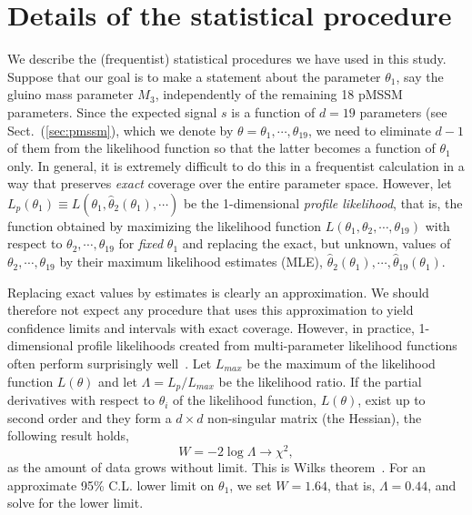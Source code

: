 \section{Details of the statistical procedure}
\label{sec:stat}
We describe the (frequentist) 
statistical procedures we have used in this study.  Suppose 
that our goal is to make a statement about the parameter $\theta_1$,
say the gluino mass
parameter $M_3$, independently of the remaining 18 pMSSM parameters. Since the 
expected signal $s$ is a function of  $d = 19$ parameters (see Sect.~(\ref{sec:pmssm}),
which we denote by $\theta = \theta_1,\cdots,\theta_{19}$,  we need to eliminate $d - 1$ of them from the likelihood function so that the latter becomes a function of $\theta_1$ only. In general, it is extremely difficult to do this in 
a frequentist calculation in a way that preserves \emph{exact} coverage over the entire parameter
space. However, let $L_p(\theta_1) \equiv L(\theta_1, \hat{\theta}_2(\theta_1), \cdots)$ be the 
1-dimensional \emph{profile likelihood}, that is, the function obtained by maximizing the likelihood function $L(\theta_1, \theta_2, \cdots, \theta_{19})$ with respect to $\theta_2,\cdots,\theta_{19}$ for \emph{fixed} $\theta_1$ and replacing the exact, but unknown, values of $\theta_2,\cdots,\theta_{19}$
by their maximum likelihood estimates (MLE),  $\hat{\theta}_2(\theta_1),\cdots,\hat{\theta}_{19}(\theta_1)$. 

Replacing exact values by estimates is clearly an approximation. We should therefore not
expect any procedure that uses this approximation to yield confidence limits and intervals
with exact coverage. However, in practice, 1-dimensional profile likelihoods created from
multi-parameter likelihood functions often perform
surprisingly well~\cite{James}.
Let $L_{max}$ be the maximum of the likelihood function $L(\theta)$ and let 
$\Lambda = L_p /  L_{max}$ be the likelihood ratio. 
If the partial derivatives with respect to $\theta_i$ of the likelihood function, $L(\theta)$, exist up to second order and they form a $d \times d$ non-singular matrix (the Hessian), 
the following result holds,
\begin{equation}
    W = -2\log\Lambda \rightarrow \chi^2,
\end{equation}
as the amount of data grows without limit. This is  Wilks theorem~\cite{Wilks, James}. For an 
approximate 95\% C.L. lower limit on $\theta_1$, we set $W = 1.64$, that is, $\Lambda = 0.44$,
and solve for the lower limit.

